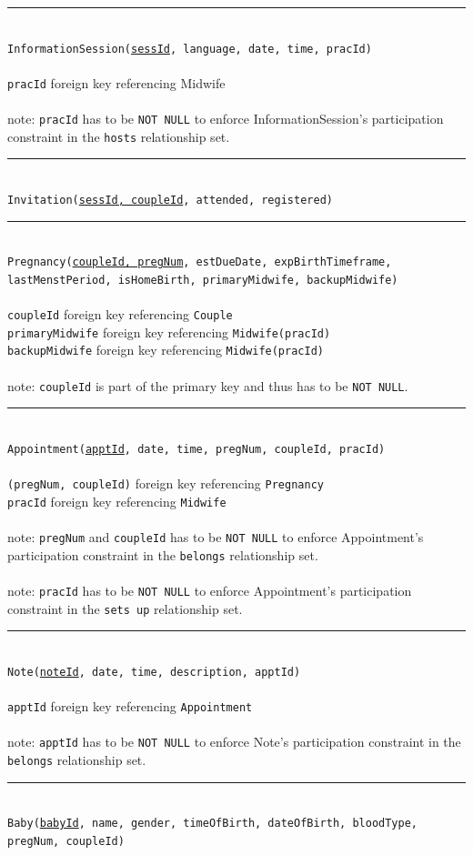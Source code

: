 \documentclass[10pt, letterpaper]{article}
\newcommand{\code}[1]{\texttt{#1}}
\newcommand{\dline}{\par\noindent\rule{\textwidth}{0.2pt}\\}
\begin{document}
\dline
\code{InformationSession(\underline{sessId}, language, date, time, pracId)}\\
\\
\code{pracId} foreign key referencing Midwife\\
\\
note: \code{pracId} has to be \code{NOT NULL} to enforce InformationSession's participation constraint in the \code{hosts} relationship set.
\dline
\code{Invitation(\underline{sessId, coupleId}, attended, registered)}
\dline
\code{Pregnancy(\underline{coupleId, pregNum}, estDueDate, expBirthTimeframe, lastMenstPeriod, isHomeBirth, primaryMidwife, backupMidwife)}\\
\\
\code{coupleId} foreign key referencing \code{Couple}\\
\code{primaryMidwife} foreign key referencing \code{Midwife(pracId)}\\
\code{backupMidwife} foreign key referencing \code{Midwife(pracId)}\\
\\
note: \code{coupleId} is part of the primary key and thus has to be \code{NOT NULL}.
\dline
\code{Appointment(\underline{apptId}, date, time, pregNum, coupleId, pracId)}\\
\\
\code{(pregNum, coupleId)} foreign key referencing \code{Pregnancy}\\
\code{pracId} foreign key referencing \code{Midwife}\\
\\
note: \code{pregNum} and \code{coupleId} has to be \code{NOT NULL} to enforce Appointment's participation constraint in the \code{belongs} relationship set.\\
\\
note: \code{pracId} has to be \code{NOT NULL} to enforce Appointment's participation constraint in the \code{sets up} relationship set.
\dline
\code{Note(\underline{noteId}, date, time, description, apptId)}\\
\\
\code{apptId} foreign key referencing \code{Appointment}\\
\\
note: \code{apptId} has to be \code{NOT NULL} to enforce Note's participation constraint in the \code{belongs} relationship set.
\dline
\code{Baby(\underline{babyId}, name, gender, timeOfBirth, dateOfBirth, bloodType, pregNum, coupleId)}\\
\\
\end{document}
